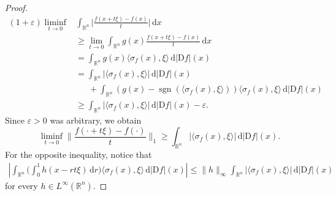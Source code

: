 \documentclass{amsart}
\newcommand{\sgn}{\operatorname{sgn}}
\newcommand{\dvtex}{\,\mathrm{d}}
\newcommand{\Dvtex}{\mathrm{D}}
\begin{document}
\begin{proof}
%
\begin{align}
(1+\varepsilon ) \liminf _{t\to 0} &\int _{\mathbb R^{n}}\Big\vert
\frac{f(x+t\xi )-f(x)}{t}\Big\vert \dvtex x
\nonumber \\
&\geq \lim _{t\to 0} \int _{\mathbb R^{n}} g(x)
\frac{f(x+t\xi )-f(x)}{t} \dvtex x
\nonumber \\
&= \int _{\mathbb R^{n}} g(x) \langle \sigma _{f}(x),\xi \rangle \dvtex |
\Dvtex f|(x)
\nonumber \\
&= \int _{\mathbb R^{n}} |\langle \sigma _{f}(x),\xi \rangle | \dvtex |
\Dvtex f|(x)
\nonumber \\
&
\phantom{=}
\, + \int _{\mathbb R^{n}} (g(x) - \sgn (\langle \sigma _{f}(x), \xi
\rangle )) \langle \sigma _{f}(x),\xi \rangle \dvtex |\Dvtex f|(x)
\nonumber \\
&\geq \int _{\mathbb R^{n}} |\langle \sigma _{f}(x),\xi \rangle | \dvtex |
\Dvtex f|(x) - \varepsilon .
\nonumber \end{align}
%
Since $\varepsilon >0$ was arbitrary, we obtain
%
\begin{equation*}
\liminf _{t\to 0} \Big\|\frac{f(\cdot +t\xi )-f(\cdot )}{t}\Big\|_{1}
\geq \int _{\mathbb R^{n}} |\langle \sigma _{f}(x), \xi \rangle | \dvtex |
\Dvtex f|(x).
\end{equation*}
%
For the opposite inequality, notice that
%
\begin{multline}
\left | \int _{\mathbb R^{n}} \Big(\int _{0}^{1} h(x-r t\xi ) \dvtex r
\Big) \langle \sigma _{f}(x),\xi \rangle \dvtex |\Dvtex f|(x) \right |
\leq \|h\|_{\infty }\int _{\mathbb R^{n}} |\langle \sigma _{f}(x),
\xi \rangle |\dvtex |\Dvtex f|(x)
\nonumber \end{multline}
%
for every $h\in L^{\infty}(\mathbb R^{n})$.
\end{proof}
\end{document}

